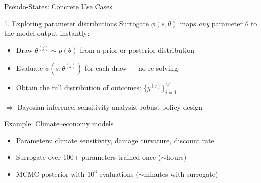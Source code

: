 \documentclass[aspectratio=169,11pt]{beamer}
\newcommand{\emphc}[1]{\textcolor{harvardcrimson}{#1}}
\begin{document}
\begin{frame}{Pseudo-States: Concrete Use Cases}
\begin{block}{1. Exploring parameter distributions}
Surrogate $\phi(s, \theta)$ maps \emph{any} parameter $\theta$ to the model output instantly:
\begin{itemize}\setlength{\itemsep}{2pt}
  \item Draw $\theta^{(j)} \sim p(\theta)$ from a prior or posterior distribution
  \item Evaluate $\phi(s, \theta^{(j)})$ for each draw --- \emphc{no re-solving}
  \item Obtain the full distribution of outcomes: $\{y^{(j)}\}_{j=1}^M$
\end{itemize}
$\Rightarrow$ \emphc{Bayesian inference, sensitivity analysis, robust policy design}
\end{block}

\vspace{0.2cm}
\begin{exampleblock}{Example: Climate--economy models}
\begin{itemize}\setlength{\itemsep}{2pt}
  \item Parameters: climate sensitivity, damage curvature, discount rate
  \item Surrogate over 100+ parameters trained once ($\sim$hours)
  \item MCMC posterior with $10^6$ evaluations ($\sim$minutes with surrogate)
\end{itemize}
\end{exampleblock}
\end{frame}
\end{document}
